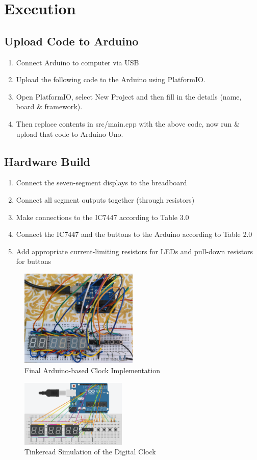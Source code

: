 \section{Execution}
\subsection{Upload Code to Arduino}
\begin{enumerate}
    \item Connect Arduino to computer via USB
    \item Upload the following code to the Arduino using PlatformIO.
\item Open PlatformIO, select New Project and then fill in the details (name, board \& framework).
\item Then replace contents in src/main.cpp with the above code, now run \& upload that code to Arduino Uno.
\end{enumerate}

\subsection{Hardware Build}
\begin{enumerate}
    \item Connect the seven-segment displays to the breadboard
    \item Connect all segment outputs together (through resistors)
    \item Make connections to the IC7447 according to Table 3.0
    \item Connect the IC7447 and the buttons to the Arduino according to Table 2.0
    \item Add appropriate current-limiting resistors for LEDs and pull-down resistors for buttons
\end{enumerate}

\begin{figure}[ht]
\centering
\includegraphics[width=0.5\textwidth]{figs/clock.jpg}
\caption{Final Arduino-based Clock Implementation}
\end{figure}

\begin{figure}[ht]
\centering
\includegraphics[width=0.45\textwidth]{figs/Clock_Tinkercad.png}
\caption{Tinkercad Simulation of the Digital Clock}
\end{figure}
